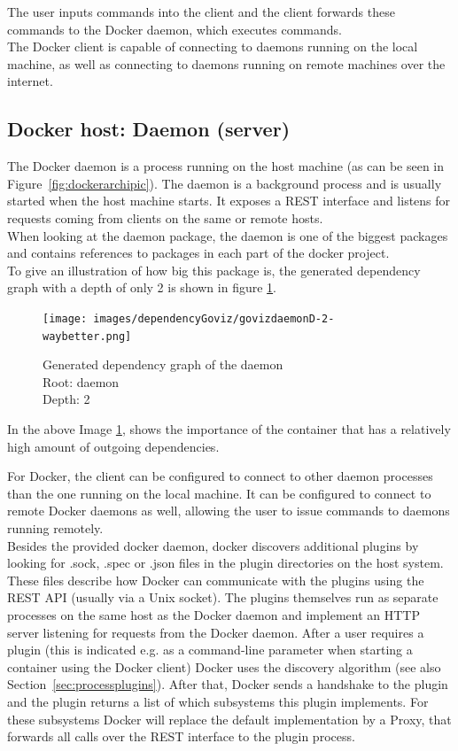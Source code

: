 The user inputs commands into the client and the client forwards these commands to the Docker daemon, which executes commands.\\
The Docker client is capable of connecting to daemons running on the local machine, as well as connecting to daemons running on remote machines over the internet.

\subsection{Docker host: Daemon (server)}
The Docker daemon is a process running on the host machine (as can be seen in Figure~\ref{fig:dockerarchipic}). 
The daemon is a background process and is usually started when the host machine starts. It exposes a REST interface and listens for requests coming from clients on the same or remote hosts.\\

When looking at the daemon package, the daemon is one of the biggest packages and contains references to packages in each part of the docker project. \\
To give an illustration of how big this package is, the generated dependency graph with a depth of only 2 is shown in figure \ref{fig:dep:deamond2}.

\begin{figure}[H]
\caption{%
Generated dependency graph of the daemon\\
Root: daemon\\
Depth: 2%
}
\centering
\texttt{[image: images/dependencyGoviz/govizdaemonD-2-waybetter.png]}
\label{fig:dep:deamond2}
\end{figure}

In the above Image \ref{fig:dep:deamond2}, shows the importance of the container that has a relatively high amount of outgoing dependencies.

For Docker, the client can be configured to connect to other daemon processes than the one running on the local machine. It can be configured to connect to remote Docker daemons as well, allowing the user to issue commands to daemons running remotely.\\

Besides the provided docker daemon, docker discovers additional plugins by looking for .sock, .spec or .json files in the plugin directories on the host system. These files describe how Docker can communicate with the plugins using the REST API (usually via a Unix socket).
The plugins themselves run as separate processes on the same host as the Docker daemon and implement an HTTP server listening for requests from the Docker daemon. After a user requires a plugin (this is indicated e.g. as a command-line parameter when starting a container using the Docker client) Docker uses the discovery algorithm (see also Section~\ref{sec:processplugins}). After that, Docker sends a handshake to the plugin and the plugin returns a list of which subsystems this plugin implements.
For these subsystems Docker will replace the default implementation by a Proxy, that forwards all calls over the REST interface to the plugin process.

